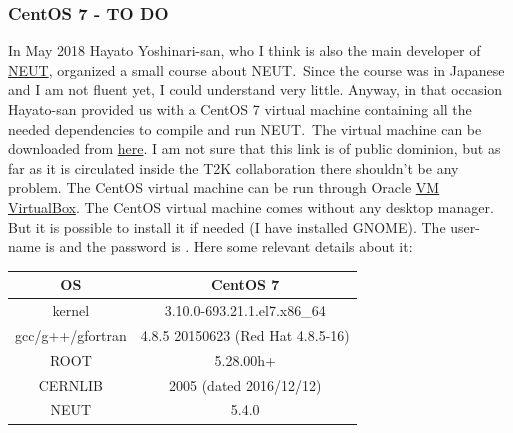 \subsubsection{CentOS 7 - TO DO}
In May 2018 Hayato Yoshinari-san, who I think is also the main
developer of \href{https://inspirehep.net/record/844435?ln=en}{NEUT},
organized a small course about NEUT.\ Since the course was in Japanese
and I am not fluent yet, I could understand very little. Anyway, in
that occasion Hayato-san provided us with a CentOS 7 virtual machine
containing all the needed dependencies to compile and run NEUT.\ The
virtual machine can be downloaded from
\href{https://tinyurl.com/y8hy9kyr}{here}. I am not sure that this
link is of public dominion, but as far as it is circulated inside the
T2K collaboration there shouldn't be any problem.  The CentOS
virtual machine can be run through Oracle
\href{http://www.oracle.com/technetwork/server-storage/%
  virtualbox/downloads/index.html}{VM VirtualBox}.  The CentOS virtual
machine comes without any desktop manager. But it is possible to
install it if needed (I have installed GNOME). The user-name is
 and the password is . Here
some relevant details about it:
\begin{center}
  \begin{tabular}{||c | c||} %
    \hline %
    OS & CentOS 7 \\ [0.5ex] 
    \hline\hline %
    kernel & 3.10.0-693.21.1.el7.x86\_64 \\
    \hline %
    gcc/g++/gfortran & 4.8.5 20150623 (Red Hat 4.8.5-16) \\ 
    \hline %
    ROOT & 5.28.00h+\\
    \hline %
    CERNLIB & 2005 (dated 2016/12/12) \\
    \hline %
    NEUT & 5.4.0 \\ [1ex] 
    \hline
  \end{tabular}
\end{center}

